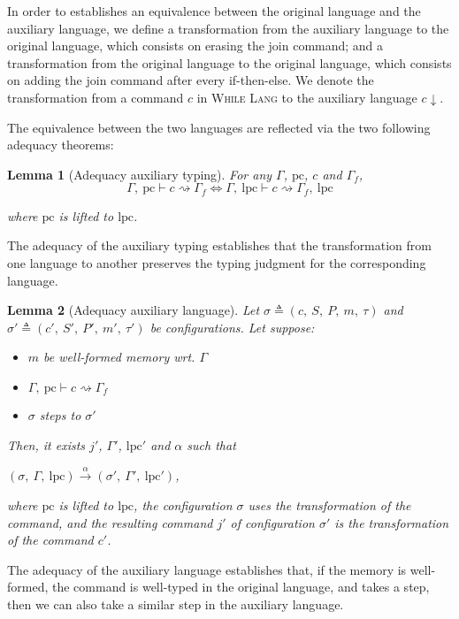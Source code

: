 \documentclass[10pt]{article}
\newcommand{\pc}{\mathrm{pc}}
\newcommand{\lpc}{\mathrm{lpc}}
\newcommand{\ctx}{\Gamma}
\newcommand{\conf}{\sigma}
\newcommand{\typing}[4]{ #1,~#2 \vdash #3 \rightsquigarrow #4}
\newcommand{\typingaux}[5]{ #1,~#2 \vdash #3 \rightsquigarrow #4,~#5}
\newcommand{\execaux}[7] { (#1,~#2,~#3) \xrightarrow{#4} (#5,~#6,~#7) }
\newcommand{\whilelang}{\textsc{While Lang} }
\newcommand{\compile}[1]{ #1 \downarrow }
\newtheorem{lemma}{Lemma}
\begin{document}
In order to establishes an equivalence between the original language and the auxiliary language, we
define a transformation from the auxiliary language to the original language, which consists on
erasing the join command; and a transformation from the original language to the original language,
which consists on adding the join command after every if-then-else.
We denote the transformation from a command $c$ in \whilelang to the auxiliary language
$\compile{c}$.

The equivalence between the two languages are reflected via the two following adequacy theorems:

\begin{lemma}[Adequacy auxiliary typing]
  For any $\ctx$, $\pc$, $c$ and $\ctx_{f}$,
  \[
  \typing{\ctx}{\pc}{c}{\ctx_{f}}
  \Leftrightarrow
    \typingaux{\ctx}{\lpc}{c}{\ctx_{f}}{\lpc}
  \]

  where $\pc$ is lifted to $\lpc$.
\end{lemma}

The adequacy of the auxiliary typing establishes that the transformation from one language to
another preserves the typing judgment for the corresponding language.

\begin{lemma}[Adequacy auxiliary language]
  Let $\conf \triangleq (c,~S,~P,~m,~\tau)$ and
  $\conf' \triangleq (c',~S',~P',~m',~\tau')$ be configurations.
  Let suppose:
  \begin{itemize}
    \item $m$ be well-formed memory wrt. $\ctx$
    \item $\typing{\ctx}{\pc}{c}{\ctx_{f}}$
    \item $\conf$ steps to $\conf'$
  \end{itemize}

  Then, it exists $j'$, $\ctx'$, $\lpc'$ and $\alpha$ such that

  \( \execaux{\conf}{\ctx}{\lpc}{\alpha}{\conf'}{\ctx'}{\lpc'} \),

  where $\pc$ is lifted to $\lpc$, the configuration $\conf$ uses the transformation of the command,
  and the resulting command $j'$ of configuration $\conf'$ is the transformation of the command $c'$.
\end{lemma}

The adequacy of the auxiliary language establishes that, if the memory is well-formed, the
command is well-typed in the original language, and takes a step, then we can also take a similar
step in the auxiliary language.
\end{document}
